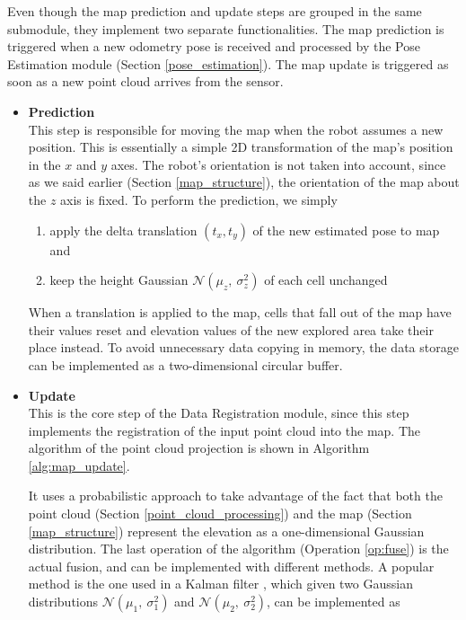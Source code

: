 Even though the map prediction and update steps are grouped in the
same submodule, they implement two separate functionalities.
The map prediction is triggered when a new odometry pose is received and
processed by the Pose Estimation module (Section \ref{pose_estimation}).
The map update is triggered as soon as a new point cloud arrives from
the sensor.
\begin{itemize}
    \item \textbf{Prediction} \\
        This step is responsible for moving the map when the robot assumes
        a new position.
        This is essentially a simple 2D transformation of the map's position
        in the $x$ and $y$ axes.
        The robot's orientation is not taken into account, since as we said
        earlier (Section \ref{map_structure}), the orientation of the map
        about the $z$ axis is fixed.
        To perform the prediction, we simply

        \begin{enumerate}
            \item apply the delta translation $(t_x,t_y)$ of the
                new estimated pose to map and
            \item keep the height Gaussian $\mathcal{N}(\mu_z, \ \sigma^2_z)$
                of each cell unchanged
        \end{enumerate}

        When a translation is applied to the map, cells that fall out of the
        map have their values reset and elevation values of the new explored
        area take their place instead.
        To avoid unnecessary data copying in memory, the data storage can be
        implemented as a two-dimensional circular buffer.

    \item \label{map_update} \textbf{Update} \\
        This is the core step of the Data Registration module, since this
        step implements the registration of the input point cloud into the map.
        The algorithm of the point cloud projection is shown in Algorithm
        \ref{alg:map_update}.

        It uses a probabilistic approach to take advantage of the
        fact that both the point cloud (Section \ref{point_cloud_processing})
        and the map (Section \ref{map_structure}) represent the elevation
        as a one-dimensional Gaussian distribution.
        The last operation of the algorithm (Operation \ref{op:fuse}) is the
        actual fusion, and can be implemented with different methods.
        A popular method is the one used in a Kalman filter
        \parencite{Cremean2005}, which given two Gaussian distributions
        $\mathcal{N}(\mu_1, \ \sigma^2_1)$ and
        $\mathcal{N}(\mu_2, \ \sigma^2_2)$, can be implemented as


\end{itemize}
